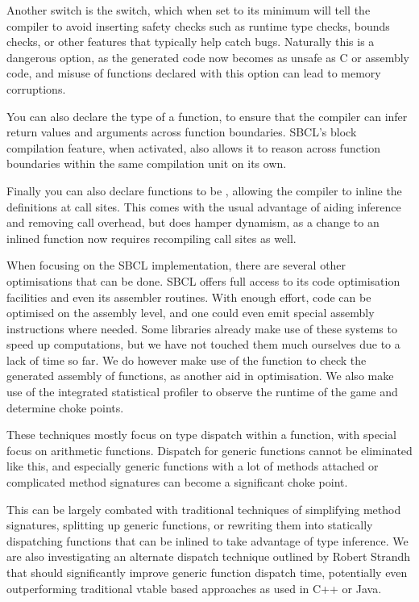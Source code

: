 \documentclass[a4paper]{paper}
\begin{document}
Another switch is the  switch, which when set to its minimum will tell the compiler to avoid inserting safety checks such as runtime type checks, bounds checks, or other features that typically help catch bugs. Naturally this is a dangerous option, as the generated code now becomes as unsafe as C or assembly code, and misuse of functions declared with this option can lead to memory corruptions.

You can also declare the type of a function, to ensure that the compiler can infer return values and arguments across function boundaries. SBCL's block compilation feature, when activated, also allows it to reason across function boundaries within the same compilation unit on its own.

Finally you can also declare functions to be , allowing the compiler to inline the definitions at call sites. This comes with the usual advantage of aiding inference and removing call overhead, but does hamper dynamism, as a change to an inlined function now requires recompiling call sites as well.

When focusing on the SBCL implementation, there are several other optimisations that can be done. SBCL offers full access to its code optimisation facilities and even its assembler routines. With enough effort, code can be optimised on the assembly level, and one could even emit special assembly instructions where needed. Some libraries already make use of these systems to speed up computations, but we have not touched them much ourselves due to a lack of time so far. We do however make use of the  function to check the generated assembly of functions, as another aid in optimisation. We also make use of the integrated statistical profiler to observe the runtime of the game and determine choke points.

These techniques mostly focus on type dispatch within a function, with special focus on arithmetic functions. Dispatch for generic functions cannot be eliminated like this, and especially generic functions with a lot of methods attached or complicated method signatures can become a significant choke point.

This can be largely combated with traditional techniques of simplifying method signatures, splitting up generic functions, or rewriting them into statically dispatching functions that can be inlined to take advantage of type inference. We are also investigating an alternate dispatch technique outlined by Robert Strandh\cite{strandh2014fast} that should significantly improve generic function dispatch time, potentially even outperforming traditional vtable based approaches as used in C++ or Java.
\end{document}
